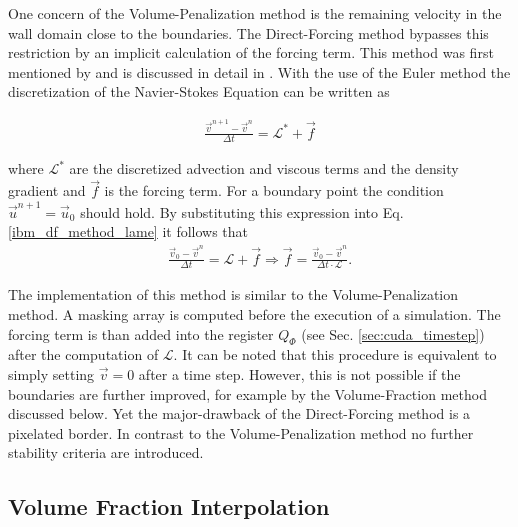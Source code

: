 One concern of the Volume-Penalization method is the remaining velocity in the wall domain close to the boundaries.
The Direct-Forcing method bypasses this restriction by an implicit calculation of the forcing term.
This method was first mentioned by \citep{mohdyusof:1997} and is discussed in detail in \citep{Fadlun2000}.
With the use of the Euler method the discretization of the Navier-Stokes Equation can be written as

\begin{align}
    \label{ibm_df_method_lame}
    \frac{\vec{v}^{n+1} -\vec{v}^n}{\Delta t} = \mathscr{L}^* + \vec{f}
\end{align}

where $\mathscr{L^*}$ are the discretized advection and viscous terms and the density gradient and $\vec{f}$ is the forcing term.
For a boundary point the condition $\vec{u}^{n+1} = \vec{u}_0$ should hold.
By substituting this expression into Eq. \ref{ibm_df_method_lame} it follows that
\begin{align}
    \frac{\vec{v}_0 -\vec{v}^n}{\Delta t} = \mathscr{L} + \vec{f} \Rightarrow \vec{f} = \frac{\vec{v}_0 -\vec{v}^n}{\Delta t\cdot \mathscr{L}}.
\end{align}

The implementation of this method is similar to the Volume-Penalization method.
A masking array is computed before the execution of a simulation.
The forcing term is than added into the register $Q_\Phi$ (see Sec. \ref{sec:cuda_timestep}) after the computation of $\mathscr{L}$.
It can be noted that this procedure is equivalent to simply setting $\vec{v}=0$ after a time step.
However, this is not possible if the boundaries are further improved, for example by the Volume-Fraction method discussed below.
Yet the major-drawback of the Direct-Forcing method is a pixelated border.
In contrast to the Volume-Penalization method no further stability criteria are introduced.

\subsection{Volume Fraction Interpolation}

